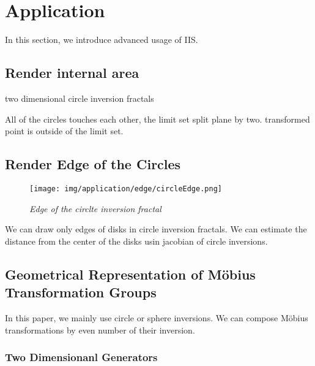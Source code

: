 
\section{Application}

In this section, we introduce advanced usage of IIS.

\subsection{Render internal area}


two dimensional circle inversion fractals

All of the circles touches each other, the limit set split plane by two.
transformed point is outside of the limit set.

\subsection{Render Edge of the Circles}

\begin{figure}[htbp]
  \center
  \texttt{[image: img/application/edge/circleEdge.png]}
  \caption{\textit{Edge of the circlte inversion fractal}}
  \label{fig:circleEdge}
 \hspace*{\fill}
\end{figure}

We can draw only edges of disks in circle inversion fractals.
We can estimate the distance from the center of the disks usin jacobian
of circle inversions.


\subsection{Geometrical Representation of M\"obius Transformation Groups}


In this paper, we mainly use circle or sphere inversions.
We can compose M\"obius transformations by even number of their
inversion.


\subsubsection{Two Dimensionanl Generators}


